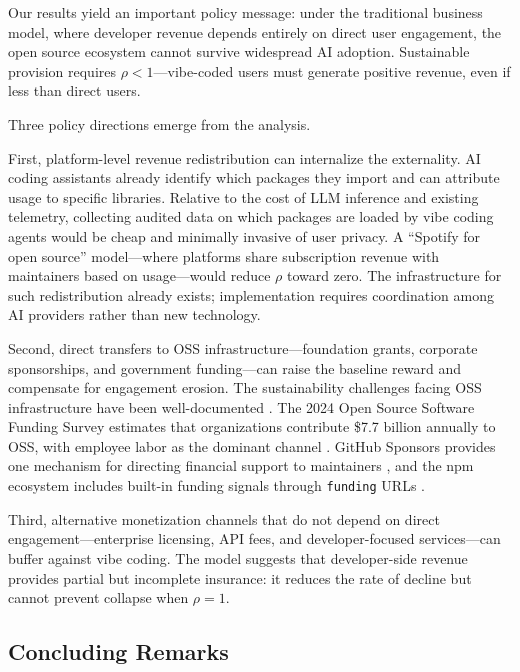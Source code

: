 \documentclass[11pt,a4paper]{article}
\theoremstyle{definition}
\theoremstyle{remark}
\begin{document}
Our results yield an important policy message: under the traditional business model, where developer revenue depends entirely on direct user engagement, the open source ecosystem cannot survive widespread AI adoption. Sustainable provision requires $\rho < 1$---vibe-coded users must generate positive revenue, even if less than direct users.

Three policy directions emerge from the analysis.

First, platform-level revenue redistribution can internalize the externality. AI coding assistants already identify which packages they import and can attribute usage to specific libraries. Relative to the cost of LLM inference and existing telemetry, collecting audited data on which packages are loaded by vibe coding agents would be cheap and minimally invasive of user privacy. A ``Spotify for open source'' model---where platforms share subscription revenue with maintainers based on usage---would reduce $\rho$ toward zero. The infrastructure for such redistribution already exists; implementation requires coordination among AI providers rather than new technology.

Second, direct transfers to OSS infrastructure---foundation grants, corporate sponsorships, and government funding---can raise the baseline reward and compensate for engagement erosion. The sustainability challenges facing OSS infrastructure have been well-documented \citep{eghbal-2016}. The 2024 Open Source Software Funding Survey estimates that organizations contribute \$7.7 billion annually to OSS, with employee labor as the dominant channel \citep{boysel-nagle-carter-hermansen-crosby-luszcz-lincoln-yue-hoffmann-staub-2024-oss-funding}. GitHub Sponsors provides one mechanism for directing financial support to maintainers \citep{github-sponsors-2026}, and the npm ecosystem includes built-in funding signals through \texttt{funding} URLs \citep{npm-fund-2022}.

Third, alternative monetization channels that do not depend on direct engagement---enterprise licensing, API fees, and developer-focused services---can buffer against vibe coding. The model suggests that developer-side revenue provides partial but incomplete insurance: it reduces the rate of decline but cannot prevent collapse when $\rho = 1$.

\subsection*{Concluding Remarks}
\end{document}
